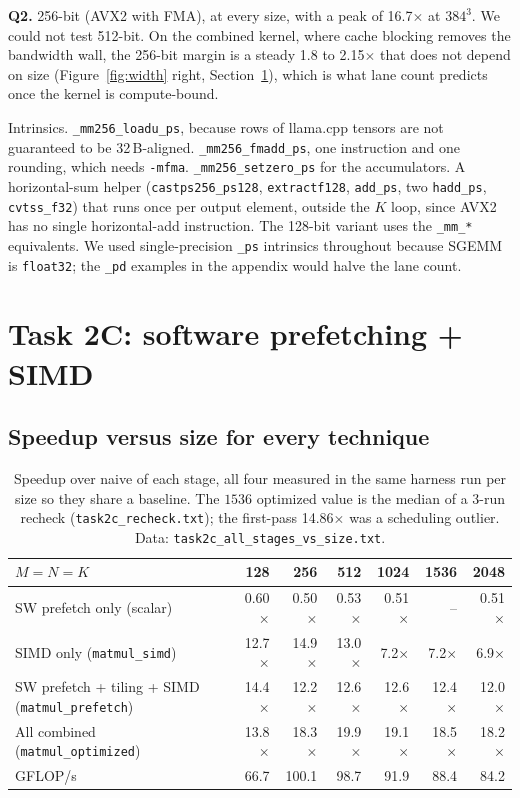 \documentclass[11pt,a4paper]{article}
\begin{document}
\textbf{Q2.} 256-bit (AVX2 with FMA), at every size, with a peak of 16.7$\times$ at $384^3$. We could not test 512-bit. On the combined kernel, where cache blocking removes the bandwidth wall, the 256-bit margin is a steady 1.8 to 2.15$\times$ that does not depend on size (Figure~\ref{fig:width} right, Section~\ref{sec:2c}), which is what lane count predicts once the kernel is compute-bound.

{\sloppy Intrinsics. \texttt{\_mm256\_loadu\_ps}, because rows of llama.cpp tensors are not guaranteed to be 32\,B-aligned. \texttt{\_mm256\_fmadd\_ps}, one instruction and one rounding, which needs \texttt{-mfma}. \texttt{\_mm256\_setzero\_ps} for the accumulators. A horizontal-sum helper (\texttt{castps256\_ps128}, \texttt{extractf128}, \texttt{add\_ps}, two \texttt{hadd\_ps}, \texttt{cvtss\_f32}) that runs once per output element, outside the $K$ loop, since AVX2 has no single horizontal-add instruction. The 128-bit variant uses the \texttt{\_mm\_*} equivalents. We used single-precision \texttt{\_ps} intrinsics throughout because SGEMM is \texttt{float32}; the \texttt{\_pd} examples in the appendix would halve the lane count.\par}

\section{Task 2C: software prefetching + SIMD}
\label{sec:2c}

\subsection{Speedup versus size for every technique}

\begin{table}[H]
\centering\small
\caption{Speedup over naive of each stage, all four measured in the same harness run per size so they share a baseline. The $1536$ optimized value is the median of a 3-run recheck (\texttt{task2c\_recheck.txt}); the first-pass 14.86$\times$ was a scheduling outlier. Data: \texttt{task2c\_all\_stages\_vs\_size.txt}.}
\label{tab:2c-size}
\begin{tabular}{lrrrrrr}
\toprule
$M=N=K$ & 128 & 256 & 512 & 1024 & 1536 & 2048 \\
\midrule
SW prefetch only (scalar)           & 0.60$\times$ & 0.50$\times$ & 0.53$\times$ & 0.51$\times$ & -- & 0.51$\times$ \\
SIMD only (\texttt{matmul\_simd})   & 12.7$\times$ & 14.9$\times$ & 13.0$\times$ & 7.2$\times$ & 7.2$\times$ & 6.9$\times$ \\
SW prefetch + tiling + SIMD (\texttt{matmul\_prefetch}) & 14.4$\times$ & 12.2$\times$ & 12.6$\times$ & 12.6$\times$ & 12.4$\times$ & 12.0$\times$ \\
All combined (\texttt{matmul\_optimized}) & 13.8$\times$ & 18.3$\times$ & 19.9$\times$ & 19.1$\times$ & 18.5$\times$ & 18.2$\times$ \\
\quad GFLOP/s & 66.7 & 100.1 & 98.7 & 91.9 & 88.4 & 84.2 \\
\bottomrule
\end{tabular}
\end{table}
\end{document}
